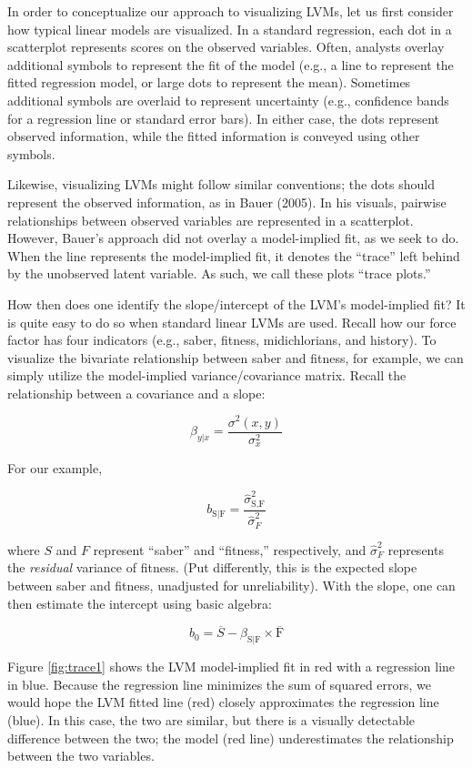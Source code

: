 \documentclass[
  english,
  doc]{apa6}
\begin{document}
In order to conceptualize our approach to visualizing LVMs, let us first consider how typical linear models are visualized. In a standard regression, each dot in a scatterplot represents scores on the observed variables. Often, analysts overlay additional symbols to represent the fit of the model (e.g., a line to represent the fitted regression model, or large dots to represent the mean). Sometimes additional symbols are overlaid to represent uncertainty (e.g., confidence bands for a regression line or standard error bars). In either case, the dots represent observed information, while the fitted information is conveyed using other symbols.

Likewise, visualizing LVMs might follow similar conventions; the dots should represent the observed information, as in Bauer (2005). In his visuals, pairwise relationships between observed variables are represented in a scatterplot. However, Bauer's approach did not overlay a model-implied fit, as we seek to do. When the line represents the model-implied fit, it denotes the ``trace'' left behind by the unobserved latent variable. As such, we call these plots ``trace plots.''

How then does one identify the slope/intercept of the LVM's model-implied fit? It is quite easy to do so when standard linear LVMs are used. Recall how our force factor has four indicators (e.g., saber, fitness, midichlorians, and history). To visualize the bivariate relationship between saber and fitness, for example, we can simply utilize the model-implied variance/covariance matrix. Recall the relationship between a covariance and a slope:

\[\beta_{y|x} = \frac{\sigma^2(x,y)}{\sigma^2_x}\]

For our example,

\[b_{\text{S}|\text{F}} = \frac{\hat{\sigma}^2_{\text{S},\text{F}}}{\hat{\sigma}^2_F}\]

\noindent where \(S\) and \(F\) represent ``saber'' and ``fitness,'' respectively, and \({\hat{\sigma}^2_F}\) represents the \emph{residual} variance of fitness. (Put differently, this is the expected slope between saber and fitness, unadjusted for unreliability). With the slope, one can then estimate the intercept using basic algebra:

\[b_0=\overline{S}-\beta_{\text{S}|\text{F}}\times \overline{\text{F}}\]

Figure \ref{fig:trace1} shows the LVM model-implied fit in red with a regression line in blue. Because the regression line minimizes the sum of squared errors, we would hope the LVM fitted line (red) closely approximates the regression line (blue). In this case, the two are similar, but there is a visually detectable difference between the two; the model (red line) underestimates the relationship between the two variables.
\end{document}
